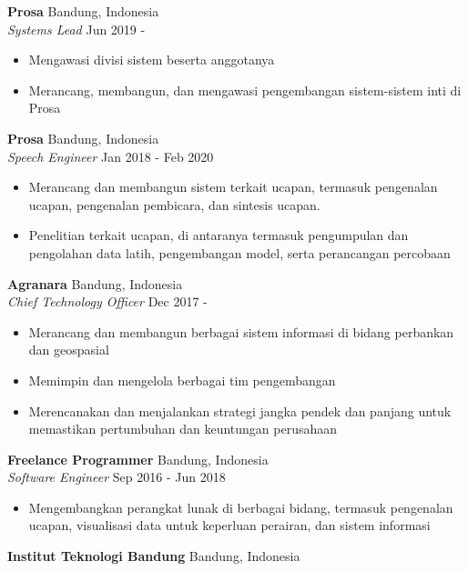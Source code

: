 \documentclass[a4paper]{article}
\begin{document}
\textbf{Prosa} \hfill Bandung, Indonesia\\
\textit{Systems Lead} \hfill Jun 2019 -\\
\vspace{-3mm}
\begin{itemize} \itemsep 1pt
  \item Mengawasi divisi sistem beserta anggotanya
  \item Merancang, membangun, dan mengawasi pengembangan sistem-sistem inti di Prosa
\end{itemize}
\textbf{Prosa} \hfill Bandung, Indonesia\\
\textit{Speech Engineer} \hfill Jan 2018 - Feb 2020\\
\vspace{-3mm}
\begin{itemize} \itemsep 1pt
  \item Merancang dan membangun sistem terkait ucapan, termasuk pengenalan
    ucapan, pengenalan pembicara, dan sintesis ucapan.
  \item Penelitian terkait ucapan, di antaranya termasuk pengumpulan dan
    pengolahan data latih, pengembangan model, serta perancangan percobaan 
\end{itemize}
\textbf{Agranara} \hfill Bandung, Indonesia\\
\textit{Chief Technology Officer} \hfill Dec 2017 -\\
\vspace{-3mm}
\begin{itemize} \itemsep 1pt
  \item Merancang dan membangun berbagai sistem informasi di bidang perbankan
    dan geospasial
  \item Memimpin dan mengelola berbagai tim pengembangan
  \item Merencanakan dan menjalankan strategi jangka pendek dan panjang untuk
    memastikan pertumbuhan dan keuntungan perusahaan
\end{itemize}
\textbf{Freelance Programmer} \hfill Bandung, Indonesia\\
\textit{Software Engineer} \hfill Sep 2016 - Jun 2018\\
\vspace{-3mm}
\begin{itemize} \itemsep 1pt
  \item Mengembangkan perangkat lunak di berbagai bidang, termasuk pengenalan
    ucapan, visualisasi data untuk keperluan perairan, dan sistem informasi
\end{itemize}
\textbf{Institut Teknologi Bandung} \hfill Bandung, Indonesia\\
\end{document}

